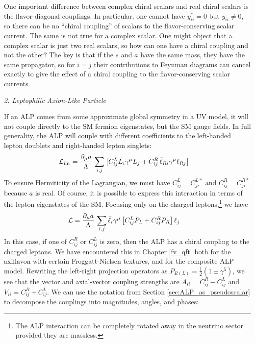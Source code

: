 One important difference between complex chiral scalars and real chiral scalars is the flavor-diagonal couplings. In particular, one cannot have $y_{ii}^* = 0$ but $y_{ii} \neq 0$, so there can be no ``chiral coupling'' of scalars to the flavor-conserving scalar current. The same is not true for a complex scalar. One might object that a complex scalar is just two real scalars, so how can one have a chiral coupling and not the other? The key is that if the $s$ and $a$ have the same mass, they have the same propagator, so for $i = j$ their contributions to Feynman diagrams can cancel exactly to give the effect of a chiral coupling to the flavor-conserving scalar currents.
\begin{center}
    {\it 2. Leptophilic Axion-Like Particle}
\end{center}
If an ALP comes from some approximate global symmetry in a UV model, it will not couple directly to the SM fermion eigenstates, but the SM gauge fields. In full generality, the ALP will couple with different coefficients to the left-handed lepton doublets and right-handed lepton singlets: 
\begin{align}
    {\cal L}_{\rm int} &= \frac{\partial_\mu a}{\Lambda} \, \sum_{i,j}\left[C^L_{ij}\bar{L}_i\gamma^\mu L_j + C^R_{ij}\, \bar{\ell}_{Ri}\gamma^\mu \ell_{Rj}\right]
\end{align}
To ensure Hermiticity of the Lagrangian, we must have $C_{ij}^L = C_{ji}^{L*}$ and $C_{ij}^R = C_{ji}^{R*}$ because $a$ is real. Of course, it is possible to express this interaction in terms of the lepton eigenstates of the SM. Focusing only on the charged leptons,\footnote{The ALP interaction can be completely rotated away in the neutrino sector provided they are massless.} we have 
\begin{align}
    {\cal L} &= \frac{\partial_\mu a}{\Lambda} \, \sum_{i,j}\bar{\ell}_i\gamma^\mu\left[C_{ij}^LP_L + C_{ij}^R P_R\right]\ell_j\label{eq:ALP_int_from_UV}
\end{align}
In this case, if one of $C_{ij}^R$ or $C_{ij}^L$ is zero, then the ALP has a chiral coupling to the charged leptons. We have encountered this in Chapter \ref{fv_qft} both for the axiflavon with certain Froggatt-Nielsen textures, and for the composite ALP model. Rewriting the left-right projection operators as $P_{R(L)} = \tfrac{1}{2}(1\pm\gamma^5)$, we see that the vector and axial-vector coupling strengths are $A_{ii} = C_{ij}^R - C_{ij}^L$ and $V_{ii} = C_{ij}^R + C_{ij}^L$. We can use the notation from Section \ref{sec:ALP_as_pseudoscalar} to decompose the couplings into magnitudes, angles, and phases:

